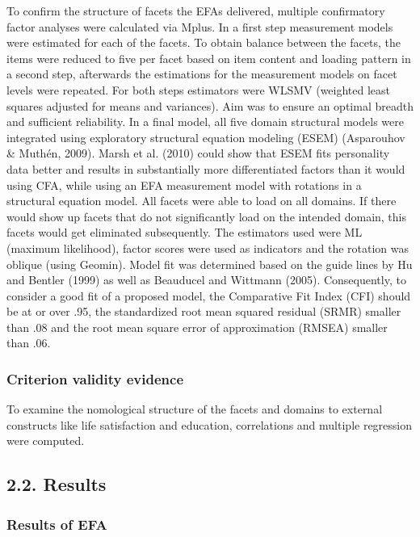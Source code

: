 \documentclass[floatsintext,man]{apa6}
\theoremstyle{definition}
\theoremstyle{definition}
\theoremstyle{definition}
\theoremstyle{remark}
\begin{document}
To confirm the structure of facets the EFAs delivered, multiple
confirmatory factor analyses were calculated via Mplus. In a first step
measurement models were estimated for each of the facets. To obtain
balance between the facets, the items were reduced to five per facet
based on item content and loading pattern in a second step, afterwards
the estimations for the measurement models on facet levels were
repeated. For both steps estimators were WLSMV (weighted least squares
adjusted for means and variances). Aim was to ensure an optimal breadth
and sufficient reliability. In a final model, all five domain structural
models were integrated using exploratory structural equation modeling
(ESEM) (Asparouhov \& Muthén, 2009). Marsh et al. (2010) could show that
ESEM fits personality data better and results in substantially more
differentiated factors than it would using CFA, while using an EFA
measurement model with rotations in a structural equation model. All
facets were able to load on all domains. If there would show up facets
that do not significantly load on the intended domain, this facets would
get eliminated subsequently. The estimators used were ML (maximum
likelihood), factor scores were used as indicators and the rotation was
oblique (using Geomin). Model fit was determined based on the guide
lines by Hu and Bentler (1999) as well as Beauducel and Wittmann (2005).
Consequently, to consider a good fit of a proposed model, the
Comparative Fit Index (CFI) should be at or over .95, the standardized
root mean squared residual (SRMR) smaller than .08 and the root mean
square error of approximation (RMSEA) smaller than .06.

\hypertarget{criterion-validity-evidence}{%
\subsubsection{Criterion validity
evidence}\label{criterion-validity-evidence}}

To examine the nomological structure of the facets and domains to
external constructs like life satisfaction and education, correlations
and multiple regression were computed.

\hypertarget{results}{%
\subsection{2.2. Results}\label{results}}

\hypertarget{results-of-efa}{%
\subsubsection{Results of EFA}\label{results-of-efa}}
\end{document}
